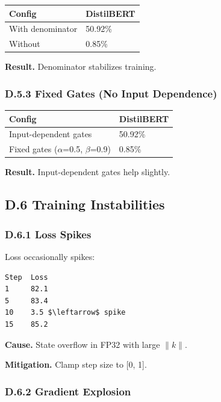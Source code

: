 \begin{table}[H]
\centering
\small
\begin{tabular}{ll}
\toprule
\textbf{Config} & \textbf{DistilBERT} \\
\midrule
With denominator & 50.92\% \\
Without & 0.85\% \\
\bottomrule
\end{tabular}
\end{table}

\textbf{Result.} Denominator stabilizes training.

\subsubsection{D.5.3 Fixed Gates (No Input Dependence)}

\begin{table}[H]
\centering
\small
\begin{tabular}{ll}
\toprule
\textbf{Config} & \textbf{DistilBERT} \\
\midrule
Input-dependent gates & 50.92\% \\
Fixed gates ($\alpha$=0.5, $\beta$=0.9) & 0.85\% \\
\bottomrule
\end{tabular}
\end{table}

\textbf{Result.} Input-dependent gates help slightly.

\subsection{D.6 Training Instabilities}

\subsubsection{D.6.1 Loss Spikes}

Loss occasionally spikes:

\begin{lstlisting}
Step  Loss
1     82.1
5     83.4
10    3.5 $\leftarrow$ spike
15    85.2
\end{lstlisting}

\textbf{Cause.} State overflow in FP32 with large $\|k\|$.

\textbf{Mitigation.} Clamp step size to [0, 1].

\subsubsection{D.6.2 Gradient Explosion}

